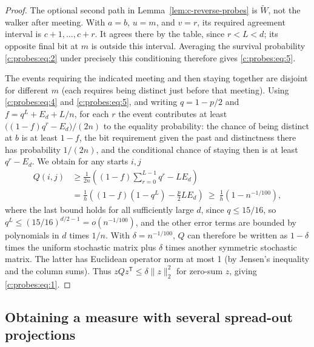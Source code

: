 \begin{proof}
The optional second path in Lemma~\ref{lem:c-reverse-probes} is
$\widetilde W$, not the walker after meeting. With $a=b$, $u=m$,
and $v=r$, its required agreement interval is $c+1,\ldots,c+r$.
It agrees there by the table, since $r<L<d$; its opposite final bit
at $m$ is outside this interval. Averaging the survival probability
\eqref{c:probes:eq:2} under precisely this conditioning therefore gives
\eqref{c:probes:eq:5}.

\label{c:probes:p016}

The events requiring the indicated meeting and then staying together are disjoint for different
\(m\) (each requires being distinct just before that meeting). Using \eqref{c:probes:eq:4} and
\eqref{c:probes:eq:5}, and writing \(q=1-p/2\) and \(f=q^L+E_d+L/n\), for each \(r\) the event
contributes at least \(\big((1-f)q^r-E_d\big)/(2n)\) to the equality probability: the chance of
being distinct at \(b\) is at least \(1-f\), the bit requirement given the past and
distinctness there has probability \(1/(2n)\), and the conditional chance of staying then is at
least \(q^r-E_d\). We obtain for any starts \(i,j\)
\[
\begin{aligned}
Q(i,j) &\ge \frac{1}{2n}\left((1-f)\sum_{r=0}^{L-1}q^r - L E_d\right)\\
 &=\frac{1}{h}\left((1-f)(1-q^L)-\frac{p}{2} L E_d\right)
 \ \ge\ \frac{1}{h}(1-n^{-1/100}),
\end{aligned}
\]
where the last bound holds for all sufficiently large \(d\), since \(q\le 15/16\), so \(q^L\le
(15/16)^{d/2-1}=o(n^{-1/100})\), and the other error terms are bounded by polynomials in \(d\)
times \(1/n\). With \(\delta=n^{-1/100}\), \(Q\) can therefore be written as \(1-\delta\) times
the uniform stochastic matrix plus \(\delta\) times another symmetric stochastic matrix. The
latter has Euclidean operator norm at most 1 (by Jensen's inequality and the column sums). Thus
\(z Q z^{\mathsf T}\le\delta\|z\|_2^2\) for zero-sum \(z\), giving \eqref{c:probes:eq:1}.
\end{proof}

\label{c:probes:p017}

\subsection{Obtaining a measure with several spread-out projections}

\label{c:probes:p018}

